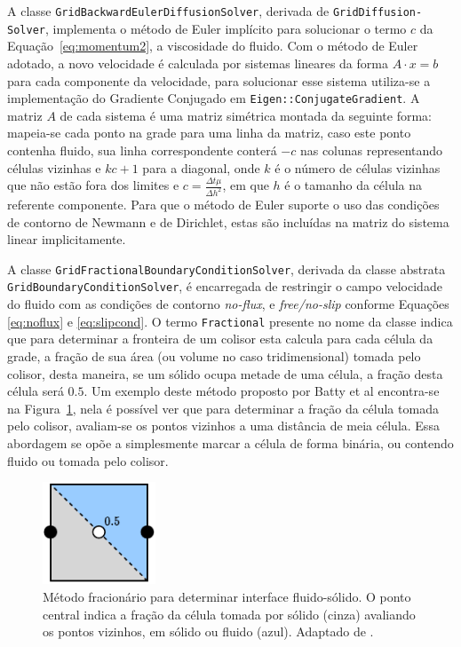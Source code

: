 \documentclass[12pt,a4paper,dvipsnames]{article}
\newcommand{\figref}[1]{Figura~\ref{#1}}
\newcommand{\eqnref}[1]{Equação~\eqref{#1}}
\begin{document}
A classe \texttt{GridBackwardEulerDiffusionSolver}, derivada de \texttt{GridDiffusion-\linebreak Solver}, implementa o método de Euler implícito para solucionar o termo $c$ da \eqnref{eq:momentum2}, a viscosidade do fluido. Com o método de Euler adotado, a novo velocidade é calculada por sistemas lineares da forma $A \cdot x = b$ para cada componente da velocidade, para solucionar esse sistema utiliza-se a implementação do Gradiente Conjugado \cite{Hestenes&Stiefel:1952} em \texttt{Eigen::ConjugateGradient}. A matriz $A$ de cada sistema é uma matriz simétrica montada da seguinte forma: mapeia-se cada ponto na grade para uma linha da matriz, caso este ponto contenha fluido, sua linha correspondente conterá $-c$ nas colunas representando células vizinhas e $kc + 1$ para a diagonal, onde $k$ é o número de células vizinhas que não estão fora dos limites e $c = \frac{\Delta t \mu }{\Delta h^2}$, em que $h$ é o tamanho da célula na referente componente. Para que o método de Euler suporte o uso das condições de contorno de Newmann e de Dirichlet, estas são incluídas na matriz do sistema linear implicitamente.


A classe \texttt{GridFractionalBoundaryConditionSolver}, derivada da classe abstrata \texttt{GridBoundaryConditionSolver}, é encarregada de restringir o campo velocidade do fluido com as condições de contorno \textit{no-flux}, e \textit{free/no-slip} conforme Equações \eqref{eq:noflux} e \eqref{eq:slipcond}. O termo \texttt{Fractional} presente no nome da classe indica que para determinar a fronteira de um colisor esta calcula para cada célula da grade, a fração de sua área (ou volume no caso tridimensional) tomada pelo colisor, desta maneira, se um sólido ocupa metade de uma célula, a fração desta célula será $0.5$. Um exemplo deste método proposto por Batty et al \cite{BattyFastVariational} encontra-se na \figref{fig:fractionalBoundary}, nela é possível ver que para determinar a fração da célula tomada pelo colisor, avaliam-se os pontos vizinhos a uma distância de meia célula. Essa abordagem se opõe a simplesmente marcar a célula de forma binária, ou contendo fluido ou tomada pelo colisor.

\begin{figure}
    \centering
    \includegraphics[width=0.3\textwidth]{FractionalGrid.pdf}
    \caption{Método fracionário para determinar interface fluido-sólido. O ponto central indica a fração da célula tomada por sólido (cinza) avaliando os pontos vizinhos, em sólido ou fluido (azul). Adaptado de \cite{BattyFastVariational}.}
    \label{fig:fractionalBoundary}
\end{figure}
\end{document}
